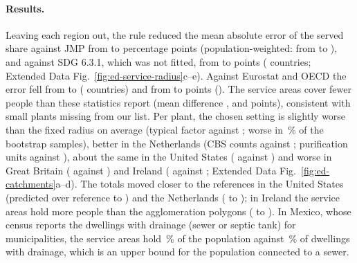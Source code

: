 \paragraph{Results.} Leaving each region out, the rule reduced the mean absolute error of the served
share against JMP from \calErrFixedJmp{} to \calErrRuleJmp{} percentage points (population-weighted:
from \calErrFixedJmpWeighted{} to \calErrRuleJmpWeighted), and against SDG 6.3.1, which was not fitted,
from \calErrFixedSdg{} to \calErrRuleSdg{} points (\calSdgCountries{} countries; Extended Data
Fig.~\ref{fig:ed-service-radius}c--e). Against Eurostat and OECD the error fell from
\calErrFixedEurostat{} to \calErrRuleEurostat{} (\calEurostatCountries{} countries) and from
\calErrFixedOecd{} to \calErrRuleOecd{} points (\calOecdCountries). The service areas cover fewer
people than these statistics report (mean difference \calBiasRuleSdg, \calBiasRuleEurostat{} and
\calBiasRuleOecd{} points), consistent with small plants missing from our list. Per plant, the chosen
setting is slightly worse than the fixed radius on average (typical factor \calPlantErrChosen{}
against \calPlantErrFixed; worse in \calShareWorse\,\% of the bootstrap samples), better in the
Netherlands (CBS counts \calTypicalNlCbsChosen{} against \calTypicalNlCbsFixed; purification units
\calTypicalNlUnitsChosen{} against \calTypicalNlUnitsFixed), about the same in the United States
(\calTypicalUsSewershedsChosen{} against \calTypicalUsSewershedsFixed) and worse in Great Britain
(\calTypicalGbCatchmentsChosen{} against \calTypicalGbCatchmentsFixed) and Ireland
(\calTypicalIeAgglomerationsChosen{} against \calTypicalIeAgglomerationsFixed; Extended Data
Fig.~\ref{fig:ed-catchments}a--d). The totals moved closer to the references in the United States
(predicted over reference \calSumRatioUsSewershedsFixed{} to \calSumRatioUsSewershedsChosen) and
the Netherlands (\calSumRatioNlCbsFixed{} to \calSumRatioNlCbsChosen); in Ireland the service areas
hold more people than the agglomeration polygons (\calSumRatioIeAgglomerationsFixed{} to
\calSumRatioIeAgglomerationsChosen). In Mexico, whose census reports the
dwellings with drainage (sewer or septic tank) for \calDistrictsMxIter{} municipalities, the service
areas hold \calServedMxIter\,\% of the population against \calDrainageMxIter\,\% of dwellings with
drainage, which is an upper bound for the population connected to a sewer.

